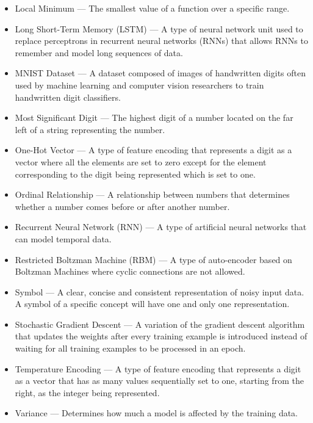 \begin{itemize}
	\item Local Minimum --- The smallest value of a function over a specific range.
	\item Long Short-Term Memory (LSTM) --- A type of neural network unit used to replace perceptrons in recurrent neural networks (RNNs) that allows RNNs to remember and model long sequences of data.
	\item MNIST Dataset --- A dataset composed of images of handwritten digits often used by machine learning and computer vision researchers to train handwritten digit classifiers.
	\item Most Significant Digit --- The highest digit of a number located on the far left of a string representing the number.
	\item One-Hot Vector --- A type of feature encoding that represents a digit as a vector where all the elements are set to zero except for the element corresponding to the digit being represented which is set to one.
	\item Ordinal Relationship --- A relationship between numbers that determines whether a number comes before or after another number. 
	\item Recurrent Neural Network (RNN) --- A type of artificial neural networks that can model temporal data.
	\item Restricted Boltzman Machine (RBM) --- A type of auto-encoder based on Boltzman Machines where cyclic connections are not allowed.
	\item Symbol --- A clear, concise and consistent representation of noisy input data. A symbol of a specific concept will have one and only one representation.
	\item Stochastic Gradient Descent --- A variation of the gradient descent algorithm that updates the weights after every training example is introduced instead of waiting for all training examples to be processed in an epoch.  
	\item Temperature Encoding --- A type of feature encoding that represents a digit as a vector that has as many values sequentially set to one, starting from the right, as the integer being represented.
	\item Variance --- Determines how much a model is affected by the training data.
\end{itemize}






\afterpreface
